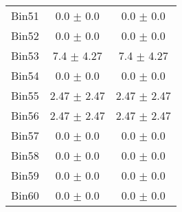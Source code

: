 \begin{tabular}{|c|c|c|}
     Bin51 & 0.0 $\pm$ 0.0 & 0.0 $\pm$ 0.0 \\ \cline{1-3} 
     Bin52 & 0.0 $\pm$ 0.0 & 0.0 $\pm$ 0.0 \\ \cline{1-3} 
     Bin53 & 7.4 $\pm$ 4.27 & 7.4 $\pm$ 4.27 \\ \cline{1-3} 
     Bin54 & 0.0 $\pm$ 0.0 & 0.0 $\pm$ 0.0 \\ \cline{1-3} 
     Bin55 & 2.47 $\pm$ 2.47 & 2.47 $\pm$ 2.47 \\ \cline{1-3} 
     Bin56 & 2.47 $\pm$ 2.47 & 2.47 $\pm$ 2.47 \\ \cline{1-3} 
     Bin57 & 0.0 $\pm$ 0.0 & 0.0 $\pm$ 0.0 \\ \cline{1-3} 
     Bin58 & 0.0 $\pm$ 0.0 & 0.0 $\pm$ 0.0 \\ \cline{1-3} 
     Bin59 & 0.0 $\pm$ 0.0 & 0.0 $\pm$ 0.0 \\ \cline{1-3} 
     Bin60 & 0.0 $\pm$ 0.0 & 0.0 $\pm$ 0.0 \\ \cline{1-3} 
  \end{tabular}
